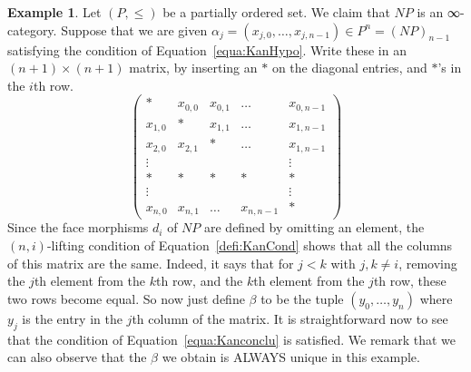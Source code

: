 \documentclass[a4paper]{amsart}
\numberwithin{figure}{section}
\theoremstyle{theorem}
\theoremstyle{definition}
\newtheorem{exam}[thm]{Example}
\begin{document}
\begin{mdframed}
\begin{exam}
Let $(P, ≤)$ be a partially ordered set. We claim that $NP$ is an ∞-category. Suppose that we are given $\alpha_j = (x_{j,0}, \dots,  x_{j,n-1}) \in P^{n} = (NP)_{n-1}$ satisfying the condition of Equation~\ref{equa:KanHypo}. Write these in an $(n+1) \times (n+1)$ matrix, by inserting an $\ast$ on the diagonal entries, and $\ast$'s in the $i$th row.
\[
\left (
\begin{array}{ccccc}
\ast & x_{0,0} & x_{0,1} & \dots & x_{0,{n-1}}  \\
x_{1, 0} & \ast & x_{1,1} & \dots & x_{1,{n-1}} \\
x_{2, 0} & x_{2,1} & \ast & \dots & x_{1,{n-1}} \\
\vdots &&&& \vdots \\
\ast & \ast &\ast &\ast &\ast \\
\vdots &&&& \vdots \\
x_{n, 0} & x_{n, 1} & \dots & x_{n, {n-1}} & \ast 
\end{array}
\right )
\] 
Since the face morphisms $d_i$ of $NP$ are defined by omitting an element, the $(n, i)$-lifting condition of Equation~\ref{defi:KanCond} shows that all the columns of this matrix are the same. Indeed, it says that for $j < k$ with $j, k \neq i$, removing the $j$th element from the $k$th row, and the $k$th element from the $j$th row, these two rows become equal. So now just define $\beta$ to be the tuple $(y_0, \dots, y_n)$ where $y_j$ is the entry in the $j$th column of the matrix. It is straightforward now to see that the condition of Equation~\ref{equa:Kanconclu} is satisfied. We remark that we can also observe that the $\beta$ we obtain is ALWAYS unique in this example.
\end{exam}
\end{mdframed}
\end{document}
